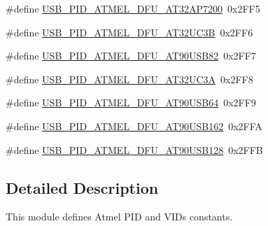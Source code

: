 \begin{DoxyCompactItemize}
\#define \hyperlink{group__usb__atmel__ids__group_gab964ea6d7b5cd446503f1cfd117c6fb7}{\-U\-S\-B\-\_\-\-P\-I\-D\-\_\-\-A\-T\-M\-E\-L\-\_\-\-D\-F\-U\-\_\-\-A\-T32\-A\-P7200}~0x2\-F\-F5
\item 
\#define \hyperlink{group__usb__atmel__ids__group_ga269e2728ce539d20958aa5f2585b66f6}{\-U\-S\-B\-\_\-\-P\-I\-D\-\_\-\-A\-T\-M\-E\-L\-\_\-\-D\-F\-U\-\_\-\-A\-T32\-U\-C3\-B}~0x2\-F\-F6
\item 
\#define \hyperlink{group__usb__atmel__ids__group_gadfe12f6d5db92d6fafd65581533f2280}{\-U\-S\-B\-\_\-\-P\-I\-D\-\_\-\-A\-T\-M\-E\-L\-\_\-\-D\-F\-U\-\_\-\-A\-T90\-U\-S\-B82}~0x2\-F\-F7
\item 
\#define \hyperlink{group__usb__atmel__ids__group_ga90c652420209632cdaf35e052c2a150f}{\-U\-S\-B\-\_\-\-P\-I\-D\-\_\-\-A\-T\-M\-E\-L\-\_\-\-D\-F\-U\-\_\-\-A\-T32\-U\-C3\-A}~0x2\-F\-F8
\item 
\#define \hyperlink{group__usb__atmel__ids__group_ga42a899ba4187b397c1d7aaf0e5c51a17}{\-U\-S\-B\-\_\-\-P\-I\-D\-\_\-\-A\-T\-M\-E\-L\-\_\-\-D\-F\-U\-\_\-\-A\-T90\-U\-S\-B64}~0x2\-F\-F9
\item 
\#define \hyperlink{group__usb__atmel__ids__group_ga9819f0f192d21296c7e548d6fb59ec32}{\-U\-S\-B\-\_\-\-P\-I\-D\-\_\-\-A\-T\-M\-E\-L\-\_\-\-D\-F\-U\-\_\-\-A\-T90\-U\-S\-B162}~0x2\-F\-F\-A
\item 
\#define \hyperlink{group__usb__atmel__ids__group_ga7cdcdd407742dfa62250a4120c95ed0b}{\-U\-S\-B\-\_\-\-P\-I\-D\-\_\-\-A\-T\-M\-E\-L\-\_\-\-D\-F\-U\-\_\-\-A\-T90\-U\-S\-B128}~0x2\-F\-F\-B
\end{DoxyCompactItemize}


\subsection{\-Detailed \-Description}
\-This module defines \-Atmel \-P\-I\-D and \-V\-I\-Ds constants. 

